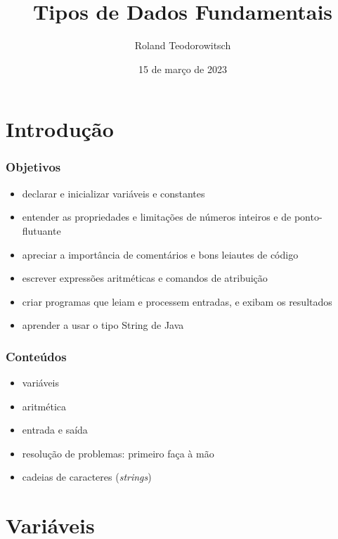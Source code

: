 \documentclass[xcolor={dvipsnames,table},aspectratio=169]{beamer}
\title[\sc{Tipos de Dados Fundamentais}]{Tipos de Dados Fundamentais}
\author[Roland Teodorowitsch]{Roland Teodorowitsch}
\institute[FPROG - EP - PUCRS]{Fundamentos de Programação - Escola Politécnica - PUCRS}
\date{15 de março de 2023}
\begin{document}
\justifying

\begin{frame}
	\titlepage
\end{frame}

\section{Introdução}

\begin{frame}\frametitle{Objetivos}
\begin{itemize}
	\item declarar e inicializar variáveis e constantes
	\item entender as propriedades e limitações de números inteiros e de ponto-flutuante
	\item apreciar a importância de comentários e bons leiautes de código
	\item escrever expressões aritméticas e comandos de atribuição
	\item criar programas que leiam e processem entradas, e exibam os resultados
	\item aprender a usar o tipo String de Java
\end{itemize}
\end{frame}

\begin{frame}\frametitle{Conteúdos}
\begin{itemize}
	\item variáveis
	\item aritmética
	\item entrada e saída
	\item resolução de problemas: primeiro faça à mão
	\item cadeias de caracteres (\emph{strings})
\end{itemize}
\end{frame}

\section{Variáveis}
\end{document}

